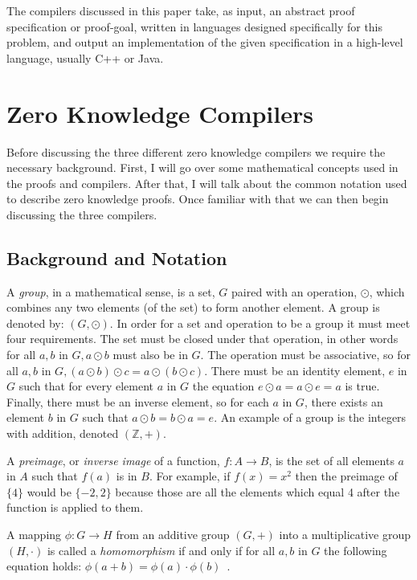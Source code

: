 \documentclass{sig-alternate}
\begin{document}
    The compilers discussed in this paper take, as input, an abstract proof 
    specification or proof-goal, written in languages designed specifically 
    for this problem, and output an implementation of the given specification in
    a high-level language, usually C++ or Java.
    
    
\section{Zero Knowledge Compilers}
	Before discussing the three different zero knowledge compilers we
	require the necessary background. First, I will go over some
	mathematical concepts used in the proofs and compilers.
	After that, I will talk about the common notation used to describe
	zero knowledge proofs. Once familiar with that we can then begin
	discussing the three compilers.
	
	\subsection{Background and Notation}
	A \textit{group}, in a mathematical sense, is a set, $G$ paired with an 
	operation, $\odot$, which combines any two elements (of the set) to form 
	another element. A group is denoted by: $(G, \odot)$. In order for a set
	and operation to be a group it must meet four requirements. The set must
	be closed under that operation, in other words for all $a, b$ in $G, a
	\odot b$ must also be in $G$. The operation must be associative, so for
	all $a, b$ in $G, (a \odot b) \odot c = a \odot (b \odot c)$. There must
	be an identity element, $e$ in $G$ such that for every element $a$ in $G$
	the equation $e \odot a = a \odot e = a$ is true. Finally, there must be
	an inverse element, so for each $a$ in $G$, there exists an element $b$ in
	$G$ such that $a \odot b = b \odot a = e$. An example of a group is the
	integers with addition, denoted $(\mathbb{Z}, +)$.
	
	A \textit{preimage}, or \textit{inverse image} of a function, $f:A \rightarrow B$, 
	is the set of all elements $a$ in $A$ such that $f(a)$ is in $B$. For example,
	if $f(x) = x^{2}$ then the preimage of $\{4\}$ would be $\{-2, 2\}$ because those
	are all the elements which equal 4 after the function is applied to them.
	
	A mapping $\phi : G \rightarrow H$ from an additive group $(G, +)$ into a
	multiplicative group $(H, \cdot)$ is called a \textit{homomorphism} if and
	only if for all $a, b$ in $G$ the following equation holds: $\phi(a + b) =
	\phi(a) \cdot \phi(b)$~\cite{Sigma:2009}.
	
\end{document}
